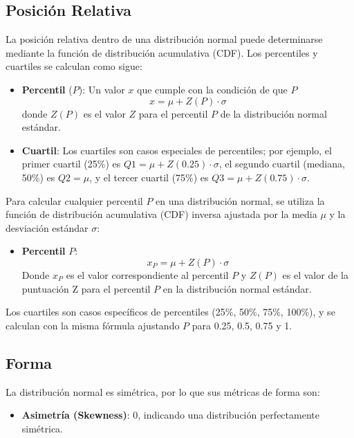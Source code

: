 \documentclass[11pt]{article}
\begin{document}
\subsection*{Posición Relativa}
La posición relativa dentro de una distribución normal puede determinarse mediante la función de distribución acumulativa (CDF). Los percentiles y cuartiles se calculan como sigue:
\begin{itemize}
	\item \textbf{Percentil} (\(P\)): Un valor \(x\) que cumple con la condición de que \(P\)%
	\[
	x = \mu + Z(P) \cdot \sigma
	\]
	donde \(Z(P)\) es el valor \(Z\) para el percentil \(P\) de la distribución normal estándar.
	
	\item \textbf{Cuartil}: Los cuartiles son casos especiales de percentiles; por ejemplo, el primer cuartil (25\%) es \(Q1 = \mu + Z(0.25) \cdot \sigma\), el segundo cuartil (mediana, 50\%) es \(Q2 = \mu\), y el tercer cuartil (75\%) es \(Q3 = \mu + Z(0.75) \cdot \sigma\).
\end{itemize}

Para calcular cualquier percentil \(P\) en una distribución normal, se utiliza la función de distribución acumulativa (CDF) inversa ajustada por la media \(\mu\) y la desviación estándar \(\sigma\):
\begin{itemize}
	\item \textbf{Percentil} \(P\): 
	\[
	x_P = \mu + Z(P) \cdot \sigma
	\]
	Donde \(x_P\) es el valor correspondiente al percentil \(P\) y \(Z(P)\) es el valor de la puntuación Z para el percentil \(P\) en la distribución normal estándar.
\end{itemize}
Los cuartiles son casos específicos de percentiles (25\%, 50\%, 75\%, 100\%), y se calculan con la misma fórmula ajustando \(P\) para 0.25, 0.5, 0.75 y 1.

\subsection*{Forma}
La distribución normal es simétrica, por lo que sus métricas de forma son:
\begin{itemize}
	\item \textbf{Asimetría (Skewness)}: 0, indicando una distribución perfectamente simétrica.
\end{itemize}
\end{document}
